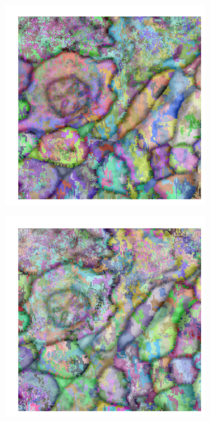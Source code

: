 \begin{figure}
\begin{subfigure}[t]{0.46 \linewidth}
        \centering
        \includegraphics[width=0.98\textwidth]{figs/comparison/min_F.pdf}
    \end{subfigure}%
    \begin{subfigure}[t]{0.46 \linewidth}
        \centering
        \includegraphics[width=0.98\textwidth]{figs/comparison/min_T.pdf}
    \end{subfigure}\hspace{0.5cm}%


\end{figure}
